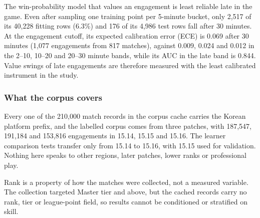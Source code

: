 The win-probability model that values an engagement is least reliable late in the game. Even
after sampling one training point per 5-minute bucket, only 2,517 of its 40,228 fitting rows
(6.3\%) and 176 of its 4,986 test rows fall after 30 minutes.
At the engagement cutoff, its expected calibration error (ECE) is 0.069 after 30 minutes (1,077
engagements from 817 matches), against 0.009, 0.024 and 0.012 in the 2--10, 10--20 and 20--30
minute bands, while its AUC in the late band is 0.844.
Value swings of late engagements are therefore measured with the least calibrated instrument in
the study.

\subsubsection{What the corpus covers}

Every one of the 210,000 match records in the corpus cache carries the Korean platform prefix,
and the labelled corpus comes from three patches, with 187,547, 191,184 and 153,816 engagements in
15.14, 15.15 and 15.16.
The learner comparison tests transfer only from 15.14 to 15.16, with 15.15 used for validation.
Nothing here speaks to other regions, later patches, lower ranks or professional play.

Rank is a property of how the matches were collected, not a measured variable. The collection
targeted Master tier and above, but the cached records carry no rank, tier or league-point
field, so results cannot be conditioned or stratified on skill.

